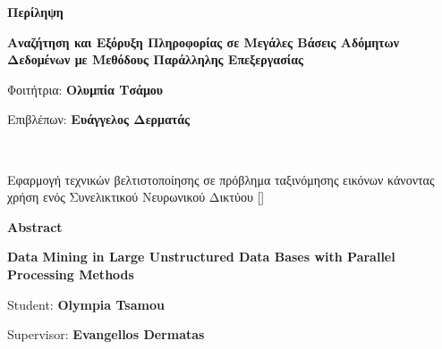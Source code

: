 \thispagestyle{plain}
\begin{center}
\Large
\textbf{Περίληψη}\\ 

\vspace{0.9cm}
\large
\textbf{Αναζήτηση και Εξόρυξη Πληροφορίας σε Μεγάλες Βάσεις Αδόμητων Δεδομένων με Μεθόδους Παράλληλης Επεξεργασίας}
    
\vspace{0.4cm}
\begin{minipage}{0.45\textwidth}
    \small
    Φοιτήτρια: 
    \textbf{Ολυμπία Τσάμου}
\end{minipage}
\begin{minipage}{0.45\textwidth}
    \small
    Επιβλέπων:
    \textbf{Ευάγγελος Δερματάς}
\end{minipage}
\\
    \vspace{0.9cm}
\end{center}

Εφαρμογή τεχνικών βελτιστοποίησης σε πρόβλημα ταξινόμησης εικόνων κάνοντας χρήση ενός Συνελικτικού Νευρωνικού Δικτύου [] \cite{cs61c}

\cleardoublepage
\thispagestyle{plain}

\begin{center}
\Large
\textbf{Abstract}\\ %

\vspace{0.9cm}
\large
\textbf{Data Mining in Large Unstructured Data Bases with Parallel Processing Methods}
    
\vspace{0.4cm}
\begin{minipage}{0.45\textwidth}
    \small
    Student: 
    \textbf{Olympia Tsamou}
\end{minipage}
\begin{minipage}{0.45\textwidth}
    \small
    Supervisor:
    \textbf{Evangellos Dermatas}
\end{minipage}
\\
\vspace{0.9cm}
\end{center}

